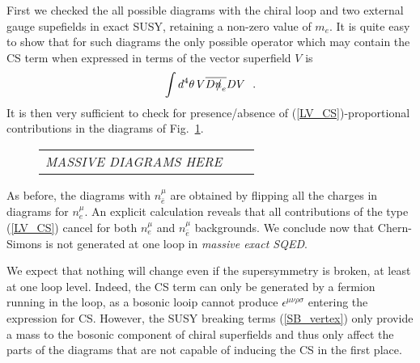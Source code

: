 \documentclass[paper,12pt]{revtex4}
\newcommand{\slashed}[1]{\hbox{{$#1$}\llap{$/$}}}
\begin{document}
	First we checked the all possible diagrams with the chiral loop and two 
  external gauge supefields in exact SUSY, retaining a non-zero value of $m_e$. 
It is quite easy to show that for such diagrams the only possible operator 
	which may contain the CS term when expressed in terms
	of the vector superfield $ V $ is
\begin{equation}
\label{LV_CS}
	\int d^4\theta \, V \overline{D\slashed{n}_e}D V~~.
\end{equation}
        It is then very sufficient to check for presence/absence of (\ref{LV_CS})-proportional
	contributions in the diagrams of Fig.~\ref{diag_gauge_massive}.
\begin{figure}[h]
 \caption{\label{diag_gauge_massive}}
\begin{center}
\begin{tabular}{ccc}
	\emph{MASSIVE DIAGRAMS HERE}
\end{tabular}
\end{center}
\end{figure}
	As before, the diagrams with $ n_{\bar{e}}^\mu $
	are obtained by flipping all the charges in diagrams for $ n_{e}^\mu $.
	An explicit calculation reveals that all contributions of the type
	(\ref{LV_CS}) cancel for both $n^\mu_e$ and $n^\mu_{\bar e}$ backgrounds. 
	We conclude now that Chern-Simons is not generated at one loop
	in {\it massive exact SQED}.

	
	We expect that nothing will change even if the supersymmetry is broken, at least at one loop level.
    Indeed, the CS term can only be generated by a fermion running in
	the loop, as a bosonic looip cannot produce 
	$ \epsilon^{\mu\nu\rho\sigma} $ entering the expression for CS.
	However, the SUSY breaking terms (\ref{SB_vertex}) only 
	provide a mass to the bosonic component of chiral superfields
	and thus only affect the parts of the diagrams that are not 
	capable of inducing the CS in the first place. 
\end{document}
